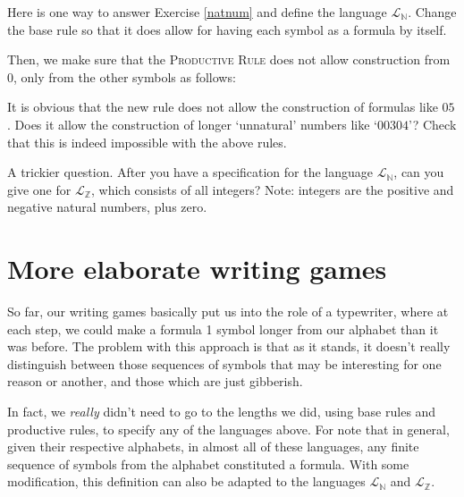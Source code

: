 \noindent Here is one way to answer Exercise \ref{natnum} and define the language $\mathcal{L}_\mathbb{N}$. Change the base rule so that it does allow for having each symbol as a formula by itself. 


Then, we make sure that the \textsc{Productive Rule} does not allow construction from $0$, only from the other symbols as follows: 


\begin{exc}
It is obvious that the new rule does not allow the construction of formulas like $05$. Does it allow the construction of longer `unnatural' numbers like `$00304$'? Check that this is indeed impossible with the above rules. 
\end{exc}

\begin{exc}
A trickier question. After you have a specification for the language $\mathcal{L}_\mathbb{N}$, can you give one for $\mathcal{L}_\mathbb{Z}$, which consists of all integers? Note: integers are the positive and negative natural numbers, plus zero. 
\end{exc}

\section{More elaborate writing games}

So far, our writing games basically put us into the role of a typewriter, where at each step, we could make a formula 1 symbol longer from our alphabet than it was before. The problem with this approach is that as it stands, it doesn't really distinguish between those sequences of symbols that may be interesting for one reason or another, and those which are just gibberish.

In fact, we \textit{really} didn't need to go to the lengths we did, using base rules and productive rules, to specify any of the languages above. For note that in general, given their respective alphabets, in almost all of these languages, any finite sequence of symbols from the alphabet constituted a formula. With some modification, this definition can also be adapted to the languages $\mathcal{L}_\mathbb{N}$ and $\mathcal{L}_\mathbb{Z}$. 

